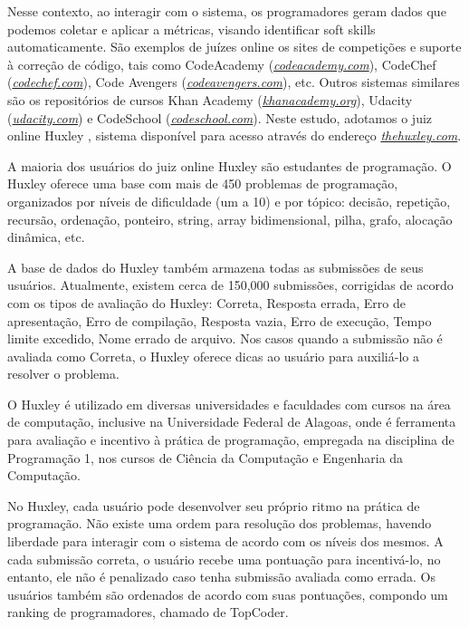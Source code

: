 Nesse contexto, ao interagir com o sistema, os programadores geram dados que podemos coletar e aplicar a métricas, visando identificar soft skills automaticamente.
São exemplos de juízes online os sites de competições e suporte à correção de código, tais como 
CodeAcademy (\href{codeacademy.com}{\textit{codeacademy.com}}), 
CodeChef (\href{codechef.com}{\textit{codechef.com}}), 
Code Avengers (\href{codeavengers.com}{\textit{codeavengers.com}}), etc.
Outros sistemas similares são os repositórios de cursos 
Khan Academy (\href{khanacademy.org}{\textit{khanacademy.org}}), 
Udacity (\href{udacity.com}{\textit{udacity.com}}) e 
CodeSchool (\href{codeschool.com}{\textit{codeschool.com}}).
Neste estudo, adotamos o juiz online Huxley \cite{paes:13}, sistema disponível para acesso através do endereço 
\href{thehuxley.com}{\textit{thehuxley.com}}.

A maioria dos usuários do juiz online Huxley são estudantes de programação. O Huxley oferece uma base com mais de 450 problemas de programação, organizados por níveis de dificuldade (um a 10) e por tópico: decisão, repetição, recursão, ordenação, ponteiro, string, array bidimensional, pilha, grafo, alocação dinâmica, etc.

A base de dados do Huxley também armazena todas as submissões de seus usuários. Atualmente, existem cerca de 150,000 submissões, corrigidas de acordo com os tipos de avaliação do Huxley: Correta, Resposta errada, Erro de apresentação, Erro de compilação, Resposta vazia, Erro de execução, Tempo limite excedido, Nome errado de arquivo. 
Nos casos quando a submissão não é avaliada como Correta, o Huxley oferece dicas ao usuário para auxiliá-lo a resolver o problema. 

O Huxley é utilizado em diversas universidades e faculdades com cursos na área de computação, inclusive na Universidade Federal de Alagoas, onde é ferramenta para avaliação e incentivo à prática de programação, empregada na disciplina de Programação 1, nos cursos de Ciência da Computação e Engenharia da Computação.

No Huxley, cada usuário pode desenvolver seu próprio ritmo na prática de programação. Não existe uma ordem para resolução dos problemas, havendo liberdade para interagir com o sistema de acordo com os níveis dos mesmos. A cada submissão correta, o usuário recebe uma pontuação para incentivá-lo, no entanto, ele não é penalizado caso tenha submissão avaliada como errada. Os usuários também são ordenados de acordo com suas pontuações, compondo um ranking de programadores, chamado de TopCoder.

